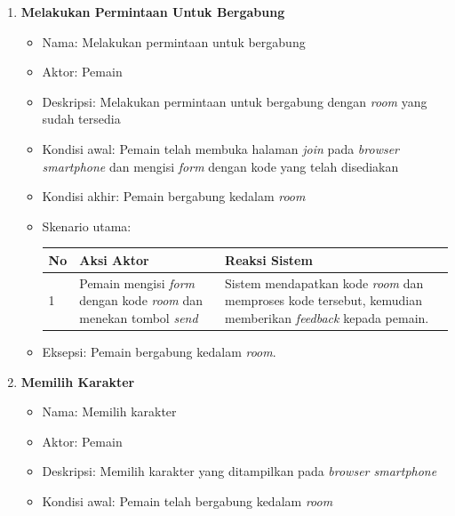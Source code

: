 \begin{enumerate}
	\item \textbf{Melakukan Permintaan Untuk Bergabung}
	
	\begin{itemize}
		\item Nama: Melakukan permintaan untuk bergabung
		
		\item Aktor: Pemain
		
		\item Deskripsi: Melakukan permintaan untuk bergabung dengan \textit{room} yang sudah tersedia
		
		\item Kondisi awal: Pemain telah membuka halaman \textit{join} pada \textit{browser smartphone} dan mengisi \textit{form} dengan kode yang telah disediakan
		
		\item Kondisi akhir: Pemain bergabung kedalam \textit{room}
		
		\item Skenario utama: 
		

\begin{tabular}{ |p{1cm}|p{4cm}|p{4cm}|}
	\hline
	No & Aksi Aktor & Reaksi Sistem \\ \hline
	1 & Pemain mengisi \textit{form} dengan kode \textit{room} dan menekan tombol \textit{send} & Sistem mendapatkan kode \textit{room} dan memproses kode tersebut, kemudian memberikan \textit{feedback} kepada pemain. \\ \hline
\end{tabular}

		\item Eksepsi: Pemain bergabung kedalam \textit{room}.

		
	\end{itemize}
	
	\item \textbf{Memilih Karakter}
	
	\begin{itemize}
		\item Nama: Memilih karakter
		
		\item Aktor: Pemain
		
		\item Deskripsi: Memilih karakter yang ditampilkan pada \textit{browser smartphone}
		
		\item Kondisi awal: Pemain telah bergabung kedalam \textit{room}
		

\end{itemize}
\end{enumerate}
